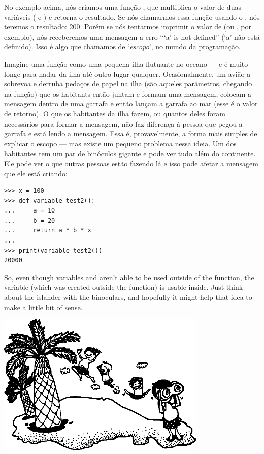 No exemplo acima, nós criamos uma função , que multiplica o valor de duas variáveis ( e ) e retorna o resultado. Se nós chamarmos essa função usando o , nós teremos o resultado: 200. Porém se nós tentarmos imprimir o valor de  (ou , por exemplo), nós receberemos uma mensagem a erro ```a' is not defined'' (`a' não está definido). Isso é algo que chamamos de `\emph{escopo}', no mundo da programação.
\par
Imagine uma função como uma pequena ilha flutuante no oceano --- e é muito longe para nadar da ilha até outro lugar qualquer. Ocasionalmente, um avião a sobrevoa e derruba pedaços de papel na ilha (são aqueles parâmetros, chegando na função) que os habitants então juntam e formam uma mensagem, colocam a mensagem dentro de uma garrafa e então lançam a garrafa ao mar (esse é o valor de retorno). O que os habitantes da ilha fazem, ou quantos deles foram necessários para formar a mensagem, não faz diferença à pessoa que pegou a garrafa e está lendo a mensagem. Essa é, provavelmente, a forma mais simples de explicar o escopo --- mas existe um pequeno problema nessa ideia. Um dos habitantes tem um par de binóculos gigante e pode ver tudo além do continente. Ele pode ver o que outras pessoas estão fazendo lá e isso pode afetar a mensagem que ele está criando:

\begin{listing}
\begin{verbatim}
>>> x = 100
>>> def variable_test2():
...     a = 10
...     b = 20
...     return a * b * x
... 
>>> print(variable_test2())
20000
\end{verbatim}
\end{listing}

So, even though variables  and  aren't able to be used outside of the function, the variable  (which was created outside the function) is usable inside.  Just think about the islander with the binoculars, and hopefully it might help that idea to make a little bit of sense.

\begin{center}
\includegraphics*[width=100mm]{eps/islanders.eps}
\end{center}

